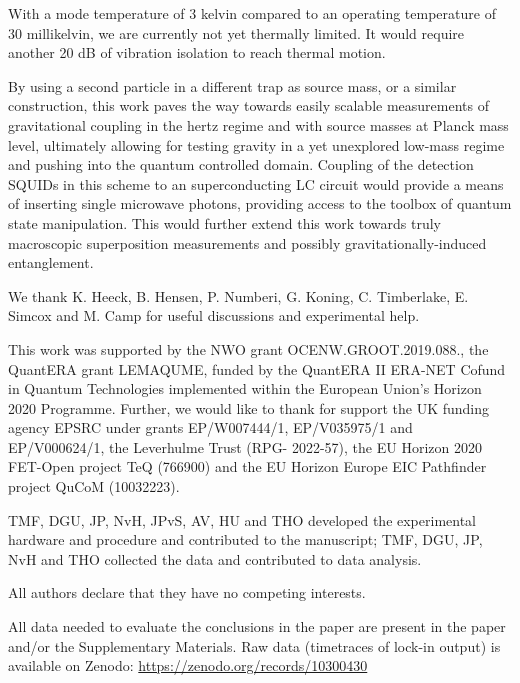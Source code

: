 \documentclass[pdflatex,sn-mathphys,12pt]{sn-jnl}
\begin{document}
    With a mode temperature of 3 kelvin compared to an operating temperature of 30 millikelvin, we are currently not yet thermally limited.
    It would require another 20 dB of vibration isolation to reach thermal motion.
    
    By using a second particle in a different trap as source mass, or a similar construction, this work paves the way towards easily scalable measurements of gravitational coupling in the hertz regime and with source masses at Planck mass level, ultimately allowing for testing gravity in a yet unexplored low-mass regime and pushing into the quantum controlled domain. Coupling of the detection SQUIDs in this scheme to an superconducting LC circuit would provide a means of inserting single microwave photons, providing access to the toolbox of quantum state manipulation. This would further extend this work towards truly macroscopic superposition measurements and possibly gravitationally-induced entanglement.
    



\backmatter

%

We thank K. Heeck, B. Hensen, P. Numberi, G. Koning, C. Timberlake, E. Simcox and M. Camp for useful discussions and experimental help.

This work was supported by the NWO grant OCENW.GROOT.2019.088., the QuantERA grant LEMAQUME, funded by the QuantERA
II ERA-NET Cofund in Quantum Technologies implemented within the European Union’s Horizon
2020 Programme. Further, we would like to thank for support the UK funding agency EPSRC
under grants EP/W007444/1, EP/V035975/1 and EP/V000624/1, the Leverhulme Trust (RPG-
2022-57), the EU Horizon 2020 FET-Open project TeQ (766900) and the EU Horizon Europe EIC Pathfinder project
QuCoM (10032223).

TMF, DGU, JP, NvH, JPvS, AV, HU and THO developed the experimental hardware and procedure and contributed to the manuscript; TMF, DGU, JP, NvH and THO collected the data and contributed to data analysis.

All authors declare that they have no competing interests.

All data needed to evaluate the conclusions in the paper are present in the paper and/or the Supplementary Materials. Raw data (timetraces of lock-in output) is available on Zenodo: \url{https://zenodo.org/records/10300430}
\end{document}

